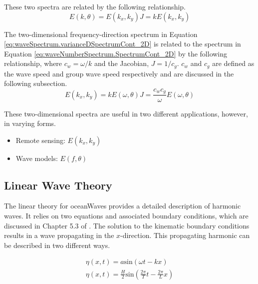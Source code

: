 These two spectra are related by the following relationship.
\begin{equation} \label{eq:waveNumberSpectrum.relateE(k,th)toE(kx,ky)_2D}
    E(k,\theta) =  E(k_{x},k_{y}) J = k E(k_{x},k_{y})
\end{equation}

The two-dimensional frequency-direction spectrum in Equation \ref{eq:waveSpectrum.varianceDSpectrumCont_2D} is related to the spectrum in Equation \ref{eq:waveNumberSpectrum.SpectrumCont_2D} by the following relationship, where $c_{w} = \omega /k$ and the Jacobian, $J = 1/c_{g}$. $c_{w}$ and $c_{g}$ are defined as the wave speed and group wave speed respectively and are discussed in the following subsection.
\begin{equation} \label{eq:waveNumberSpectrum.relateE(kx,ky)toE(w,th)_2D}
    E(k_{x},k_{y}) =  k E(\omega,\theta) J = \frac{c_{w} c_{g}}{\omega} E(\omega,\theta)
\end{equation}

These two-dimensional spectra are useful in two different applications, however, in varying forms.
\begin{itemize}
    \item Remote sensing: $E(k_{x},k_{y})$
    \item Wave models: $E(f,\theta)$
\end{itemize}

\subsection{Linear Wave Theory} \label{subsec:theory.waves.linearWaveTheory}

The linear theory for \gls{oceanWaves} provides a detailed description of harmonic waves. It relies on two equations and associated boundary conditions, which are discussed in Chapter 5.3 of \cite{Holthuijsen2007}. The solution to the kinematic boundary conditions results in a wave propagating in the $x$-direction. This propagating harmonic can be described in two different ways.

\begin{subequations}  \label{eq:linearWaveTheory.propHarmonicWave}
  \begin{align}
    \eta(x,t) = a\text{sin}(\omega t - kx) \\
    \eta(x,t) = \frac{H}{2}\text{sin} \left ( \frac{2\pi}{T}t - \frac{2\pi}{L}x \right )
  \end{align}
\end{subequations} 


